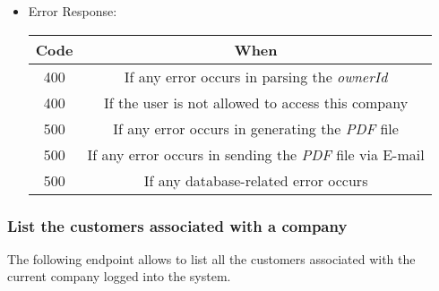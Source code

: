 \begin{itemize}
    \item Error Response:
    \begin{table}[!h]
    \centering
    \begin{tabular}{|c|c|}
    \hline
    \multicolumn{1}{|c|}{\textbf{Code}} & \multicolumn{1}{c|}{\textbf{When}} \\ \hline
    400 & If any error occurs in parsing the \textit{ownerId}  \\\hline
    400 & If the user is not allowed to access this company \\\hline
    500 & If any error occurs in generating the \textit{PDF} file \\\hline
    500 & If any error occurs in sending the \textit{PDF} file via E-mail\\\hline
    500 & If any database-related error occurs \\\hline
    \end{tabular}
    \end{table}

\end{itemize}



\newpage
\subsubsection*{List the customers associated with a company}

The following endpoint allows to list all the customers associated with the current company logged into the system.

